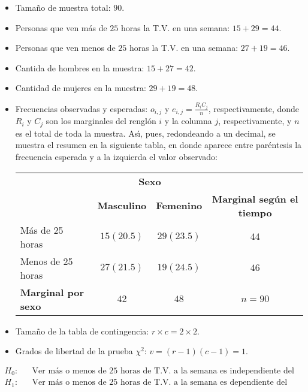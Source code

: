 \begin{solucion}
 \begin{datos}
  $\phantom{0}$
  \begin{itemize}
   \item Tamaño de muestra total: $90$.
   \item Personas que ven m\'as de $25$ horas la T.V. en una semana:
   $15 + 29 = 44$.
   \item Personas que ven menos de $25$ horas la T.V. en una semana:
   $27 + 19 = 46$.
   \item Cantida de hombres en la muestra: $15 + 27 = 42$.
   \item Cantidad de mujeres en la muestra: $29 + 19 = 48$.
   \item Frecuencias observadas y esperadas: $o_{i,j}$
   y $e_{i,j}=\frac{R_i C_j}{n}$, respectivamente,
   donde $R_i$ y $C_j$ son los marginales del rengl\'on $i$ y la columna $j$,
   respectivamente, y $n$ es el total de toda la muestra.
   As\'{\i}, pues, redondeando a un decimal, se muestra el resumen 
   en la siguiente tabla,
   en donde aparece entre par\'entesis la frecuencia esperada
   y a la izquierda el valor observado:
   \begin{center}
    \begin{tabular}{lcc|c}
     & \multicolumn{2}{c}{\textbf{Sexo}} \\
     \cline{2-3}
     & \textbf{Masculino} & \textbf{Femenino} &
     \textbf{Marginal seg\'un el tiempo} \\
     \hline 
     M\'as de 25 horas & $15 (20.5)$ & $29 (23.5)$ & $44$ \\
     Menos de 25 horas & $27 (21.5)$ & $19 (24.5)$ & $46$ \\
     \hline 
     \textbf{Marginal por sexo} & $42$ & $48$ & $n=90$
    \end{tabular}
   \end{center}
   \item Tama\~no de la tabla de contingencia: $r\times c = 2\times 2$.
   \item Grados de libertad de la prueba $\chi^2$: $v = (r-1)(c-1) = 1$.
  \end{itemize}
 \end{datos}

 \begin{hipotesis}
  \begin{eqnarray*}
   H_0: & & \text{Ver m\'as o menos de 25 horas de T.V. a la semana es independiente del sexo.} \\
   H_1: & & \text{Ver m\'as o menos de 25 horas de T.V. a la semana es dependiente del sexo.}
  \end{eqnarray*}
 \end{hipotesis}


\end{solucion}
